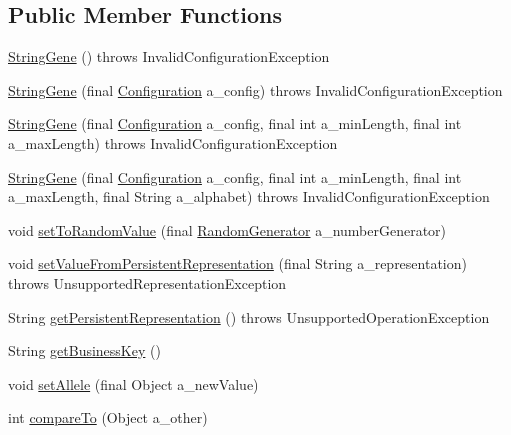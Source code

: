 \subsection*{Public Member Functions}
\begin{DoxyCompactItemize}
\item 
\hyperlink{classorg_1_1jgap_1_1impl_1_1_string_gene_a8746e39374897e94926101003c153e80}{String\-Gene} ()  throws Invalid\-Configuration\-Exception 
\item 
\hyperlink{classorg_1_1jgap_1_1impl_1_1_string_gene_a33692accfe9640de589a06cffb4a7d02}{String\-Gene} (final \hyperlink{classorg_1_1jgap_1_1_configuration}{Configuration} a\-\_\-config)  throws Invalid\-Configuration\-Exception 
\item 
\hyperlink{classorg_1_1jgap_1_1impl_1_1_string_gene_a3e26568ddc4520889daf70547db8dfb3}{String\-Gene} (final \hyperlink{classorg_1_1jgap_1_1_configuration}{Configuration} a\-\_\-config, final int a\-\_\-min\-Length, final int a\-\_\-max\-Length)  throws Invalid\-Configuration\-Exception 
\item 
\hyperlink{classorg_1_1jgap_1_1impl_1_1_string_gene_ace800f00686df81e25e62d4271667ff8}{String\-Gene} (final \hyperlink{classorg_1_1jgap_1_1_configuration}{Configuration} a\-\_\-config, final int a\-\_\-min\-Length, final int a\-\_\-max\-Length, final String a\-\_\-alphabet)  throws Invalid\-Configuration\-Exception 
\item 
void \hyperlink{classorg_1_1jgap_1_1impl_1_1_string_gene_a8f5e8e9b1e5051e6b497ba6996ec6214}{set\-To\-Random\-Value} (final \hyperlink{interfaceorg_1_1jgap_1_1_random_generator}{Random\-Generator} a\-\_\-number\-Generator)
\item 
void \hyperlink{classorg_1_1jgap_1_1impl_1_1_string_gene_a6300aa56c257d02ece7298fe6fccbc36}{set\-Value\-From\-Persistent\-Representation} (final String a\-\_\-representation)  throws Unsupported\-Representation\-Exception 
\item 
String \hyperlink{classorg_1_1jgap_1_1impl_1_1_string_gene_a79af8bfa3fb168ff61d4945b9ed4a319}{get\-Persistent\-Representation} ()  throws Unsupported\-Operation\-Exception 
\item 
String \hyperlink{classorg_1_1jgap_1_1impl_1_1_string_gene_a8cab2846ca49b7aa6d6c23a028aded45}{get\-Business\-Key} ()
\item 
void \hyperlink{classorg_1_1jgap_1_1impl_1_1_string_gene_ad85c7164cd5ed0dfb4abf496ae3ec29b}{set\-Allele} (final Object a\-\_\-new\-Value)
\item 
int \hyperlink{classorg_1_1jgap_1_1impl_1_1_string_gene_a7deda1b70647eb5598875aecbf2c73a2}{compare\-To} (Object a\-\_\-other)

\end{DoxyCompactItemize}

